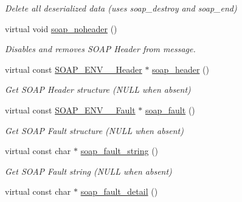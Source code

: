 \begin{DoxyCompactItemize}
\begin{DoxyCompactList}\small\item\em Delete all deserialized data (uses soap\_\-destroy and soap\_\-end) \end{DoxyCompactList}\item 
\hypertarget{classOntologyQuerySoapBindingProxy_a8c1f28f67b09eb969f521d98e629be17}{
virtual void \hyperlink{classOntologyQuerySoapBindingProxy_a8c1f28f67b09eb969f521d98e629be17}{soap\_\-noheader} ()}
\label{classOntologyQuerySoapBindingProxy_a8c1f28f67b09eb969f521d98e629be17}

\begin{DoxyCompactList}\small\item\em Disables and removes SOAP Header from message. \end{DoxyCompactList}\item 
\hypertarget{classOntologyQuerySoapBindingProxy_a765cf648289e6343770a050b08f7467c}{
virtual const \hyperlink{structSOAP__ENV____Header}{SOAP\_\-ENV\_\-\_\-Header} $\ast$ \hyperlink{classOntologyQuerySoapBindingProxy_a765cf648289e6343770a050b08f7467c}{soap\_\-header} ()}
\label{classOntologyQuerySoapBindingProxy_a765cf648289e6343770a050b08f7467c}

\begin{DoxyCompactList}\small\item\em Get SOAP Header structure (NULL when absent) \end{DoxyCompactList}\item 
\hypertarget{classOntologyQuerySoapBindingProxy_a0a8cc62c6401ca21560b3b54c5336956}{
virtual const \hyperlink{structSOAP__ENV____Fault}{SOAP\_\-ENV\_\-\_\-Fault} $\ast$ \hyperlink{classOntologyQuerySoapBindingProxy_a0a8cc62c6401ca21560b3b54c5336956}{soap\_\-fault} ()}
\label{classOntologyQuerySoapBindingProxy_a0a8cc62c6401ca21560b3b54c5336956}

\begin{DoxyCompactList}\small\item\em Get SOAP Fault structure (NULL when absent) \end{DoxyCompactList}\item 
\hypertarget{classOntologyQuerySoapBindingProxy_afbf4cf7234915869c7dcc456151088ba}{
virtual const char $\ast$ \hyperlink{classOntologyQuerySoapBindingProxy_afbf4cf7234915869c7dcc456151088ba}{soap\_\-fault\_\-string} ()}
\label{classOntologyQuerySoapBindingProxy_afbf4cf7234915869c7dcc456151088ba}

\begin{DoxyCompactList}\small\item\em Get SOAP Fault string (NULL when absent) \end{DoxyCompactList}\item 
\hypertarget{classOntologyQuerySoapBindingProxy_a1193cfd6a05f4dbbbd8a084f441cbacc}{
virtual const char $\ast$ \hyperlink{classOntologyQuerySoapBindingProxy_a1193cfd6a05f4dbbbd8a084f441cbacc}{soap\_\-fault\_\-detail} ()}
\label{classOntologyQuerySoapBindingProxy_a1193cfd6a05f4dbbbd8a084f441cbacc}


\end{DoxyCompactItemize}
